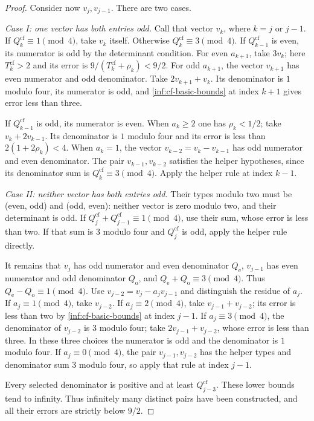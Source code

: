 \begin{proof}
Consider now $v_j,v_{j-1}$. There are two cases.

\emph{Case I: one vector has both entries odd.}
Call that vector $v_k$, where $k=j$ or $j-1$.
If $Q_k^{\mathrm{cf}}\equiv1\pmod4$, take $v_k$ itself.
Otherwise $Q_k^{\mathrm{cf}}\equiv3\pmod4$.
If $Q_{k-1}^{\mathrm{cf}}$ is even, its numerator is odd by the determinant condition.
For even $a_{k+1}$, take $3v_k$; here $T_k^{\mathrm{cf}}>2$ and its error is
$9/(T_k^{\mathrm{cf}}+\rho_k)<9/2$.
For odd $a_{k+1}$, the vector $v_{k+1}$ has even numerator and odd
denominator. Take $2v_{k+1}+v_k$. Its denominator is $1$ modulo four,
its numerator is odd, and \eqref{inf:cf-basic-bounds} at index $k+1$
gives error less than three.

If $Q_{k-1}^{\mathrm{cf}}$ is odd, its numerator is even.
When $a_k\ge2$ one has $\rho_k<1/2$; take
$v_k+2v_{k-1}$. Its denominator is $1$ modulo four and its error is
less than $2(1+2\rho_k)<4$.
When $a_k=1$, the vector $v_{k-2}=v_k-v_{k-1}$ has odd numerator
and even denominator. The pair $v_{k-1},v_{k-2}$ satisfies the helper
hypotheses, since its denominator sum is $Q_k^{\mathrm{cf}}\equiv3\pmod4$.
Apply the helper rule at index $k-1$.

\emph{Case II: neither vector has both entries odd.}
Their types modulo two must be (even, odd) and (odd, even): neither
vector is zero modulo two, and their determinant is odd.
If $Q_j^{\mathrm{cf}}+Q_{j-1}^{\mathrm{cf}}\equiv1\pmod4$, use their sum, whose error is less
than two. If that sum is $3$ modulo four and $Q_j^{\mathrm{cf}}$ is odd, apply the
helper rule directly.

It remains that $v_j$ has odd numerator and even denominator $Q_{\mathrm e}$,
$v_{j-1}$ has even numerator and odd denominator $Q_{\mathrm o}$, and
$Q_{\mathrm e}+Q_{\mathrm o}\equiv3\pmod4$.
Thus $Q_{\mathrm e}-Q_{\mathrm o}\equiv1\pmod4$.
Use $v_{j-2}=v_j-a_jv_{j-1}$ and distinguish the residue of $a_j$.
If $a_j\equiv1\pmod4$, take $v_{j-2}$.
If $a_j\equiv2\pmod4$, take $v_{j-1}+v_{j-2}$; its error is less
than two by \eqref{inf:cf-basic-bounds} at index $j-1$.
If $a_j\equiv3\pmod4$, the denominator of $v_{j-2}$ is $3$ modulo
four; take $2v_{j-1}+v_{j-2}$, whose error is less than three.
In these three choices the numerator is odd and the denominator is
$1$ modulo four. If $a_j\equiv0\pmod4$, the pair
$v_{j-1},v_{j-2}$ has the helper types and denominator sum $3$ modulo
four, so apply that rule at index $j-1$.

Every selected denominator is positive and at least $Q_{j-3}^{\mathrm{cf}}$.
These lower bounds tend to infinity. Thus infinitely many distinct
pairs have been constructed, and all their errors are strictly below
$9/2$.
\end{proof}


